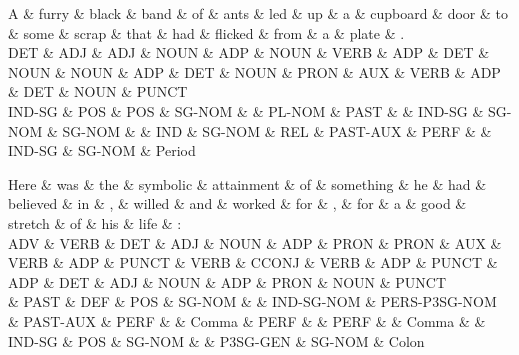 \begin{dependency}
\begin{deptext}
A \& furry \& black \& band \& of \& ants \& led \& up \& a \& cupboard \& door \& to \& some \& scrap \& that \& had \& flicked \& from \& a \& plate \& . \\
DET \& ADJ \& ADJ \& NOUN \& ADP \& NOUN \& VERB \& ADP \& DET \& NOUN \& NOUN \& ADP \& DET \& NOUN \& PRON \& AUX \& VERB \& ADP \& DET \& NOUN \& PUNCT \\
IND-SG \& POS \& POS \& SG-NOM \&  \& PL-NOM \& PAST \&  \& IND-SG \& SG-NOM \& SG-NOM \&  \& IND \& SG-NOM \& REL \& PAST-AUX \& PERF \&  \& IND-SG \& SG-NOM \& Period \\
\end{deptext}



\end{dependency}

\begin{dependency}
\begin{deptext}
Here \& was \& the \& symbolic \& attainment \& of \& something \& he \& had \& believed \& in \& , \& willed \& and \& worked \& for \& , \& for \& a \& good \& stretch \& of \& his \& life \& : \\
ADV \& VERB \& DET \& ADJ \& NOUN \& ADP \& PRON \& PRON \& AUX \& VERB \& ADP \& PUNCT \& VERB \& CCONJ \& VERB \& ADP \& PUNCT \& ADP \& DET \& ADJ \& NOUN \& ADP \& PRON \& NOUN \& PUNCT \\
 \& PAST \& DEF \& POS \& SG-NOM \&  \& IND-SG-NOM \& PERS-P3SG-NOM \& PAST-AUX \& PERF \&  \& Comma \& PERF \&  \& PERF \&  \& Comma \&  \& IND-SG \& POS \& SG-NOM \&  \& P3SG-GEN \& SG-NOM \& Colon \\
\end{deptext}



\end{dependency}

